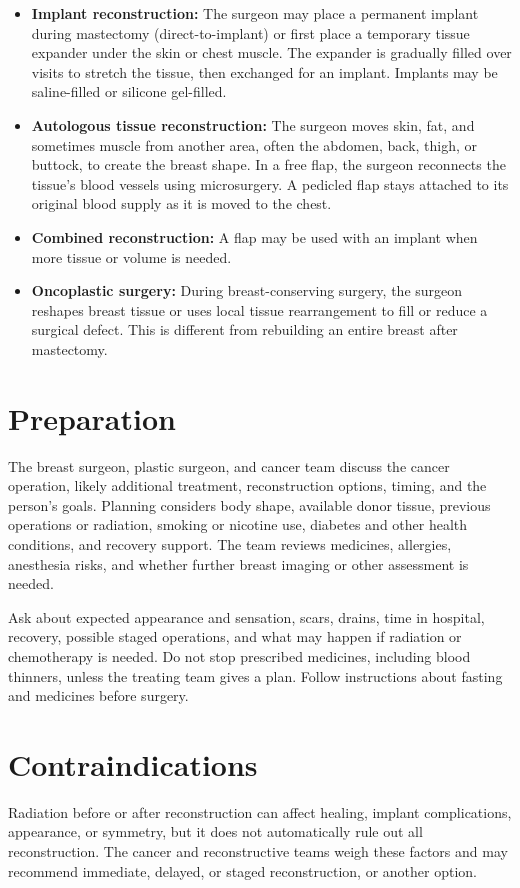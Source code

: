 \begin{itemize}
  \item \textbf{Implant reconstruction:} The surgeon may place a permanent implant during mastectomy (direct-to-implant) or first place a temporary tissue expander under the skin or chest muscle. The expander is gradually filled over visits to stretch the tissue, then exchanged for an implant. Implants may be saline-filled or silicone gel-filled.
  \item \textbf{Autologous tissue reconstruction:} The surgeon moves skin, fat, and sometimes muscle from another area, often the abdomen, back, thigh, or buttock, to create the breast shape. In a free flap, the surgeon reconnects the tissue's blood vessels using microsurgery. A pedicled flap stays attached to its original blood supply as it is moved to the chest.
  \item \textbf{Combined reconstruction:} A flap may be used with an implant when more tissue or volume is needed.
  \item \textbf{Oncoplastic surgery:} During breast-conserving surgery, the surgeon reshapes breast tissue or uses local tissue rearrangement to fill or reduce a surgical defect. This is different from rebuilding an entire breast after mastectomy.
\end{itemize}

\section*{Preparation}
The breast surgeon, plastic surgeon, and cancer team discuss the cancer operation, likely additional treatment, reconstruction options, timing, and the person's goals. Planning considers body shape, available donor tissue, previous operations or radiation, smoking or nicotine use, diabetes and other health conditions, and recovery support. The team reviews medicines, allergies, anesthesia risks, and whether further breast imaging or other assessment is needed.

Ask about expected appearance and sensation, scars, drains, time in hospital, recovery, possible staged operations, and what may happen if radiation or chemotherapy is needed. Do not stop prescribed medicines, including blood thinners, unless the treating team gives a plan. Follow instructions about fasting and medicines before surgery.

\section*{Contraindications}
Radiation before or after reconstruction can affect healing, implant complications, appearance, or symmetry, but it does not automatically rule out all reconstruction. The cancer and reconstructive teams weigh these factors and may recommend immediate, delayed, or staged reconstruction, or another option.

